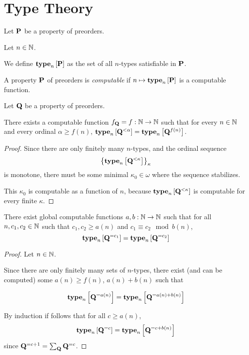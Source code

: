 \section{Type Theory}
\begin{definition}
    Let $\mathbf{P}$ be a property of preorders.

    Let $n \in \mathbb{N}$.

    We define $\mathbf{type}_{n} \left[ {\mathbf{P}} \right]$ as the set of all
    $n$-types satisfiable in $\mathbf{P}$.
\end{definition}

\begin{definition}
    A property $\mathbf{P}$ of preorders is \emph{computable} if
    $n \mapsto \mathbf{type}_{n} \left[ {\mathbf{P}} \right]$ is a computable function.
\end{definition}

\begin{lemma}\label{f-lemma}
    Let $\mathbf{Q}$ be a property of preorders.

    There exists a computable function $f_{\mathbf{Q}} = f: \mathbb{N} \to \mathbb{N}$ such that
    for every $n \in \mathbb{N}$ and every ordinal $\alpha \ge f(n)$,
    $\mathbf{type}_{n} \left[ {\mathbf{Q}^{< \alpha}} \right] = \mathbf{type}_{n} \left[ {\mathbf{Q}^{f(n)}} \right]$.
\end{lemma}

\begin{proof}
    Since there are only finitely many $n$-types,
    and the ordinal sequence \[\left\{ {\mathbf{type}_{n} \left[ {\mathbf{Q}^{< \kappa}} \right]} \right\}_{\kappa}\]
    is monotone,
    there must be some minimal $\kappa_0 \in \omega$ where the sequence stabilizes.

    This $\kappa_0$ is computable as a function of $n$, because
    $\mathbf{type}_{n} \left[ {\mathbf{Q}^{< \kappa}} \right]$ is computable for every finite $\kappa$.
\end{proof}

\begin{lemma}\label{ab-lemma}
    There exist global computable functions $a, b : \mathbb{N} \to \mathbb{N}$ such that
    for all $n, c_1, c_2 \in \mathbb{N}$ such that $c_1, c_2 \ge a(n)$ and $c_1 \equiv c_2 \mod b(n)$,
    \[\mathbf{type}_{n} \left[ {\mathbf{Q}^{= c_1}} \right] = \mathbf{type}_{n} \left[ {\mathbf{Q}^{= c_2}} \right]\]
\end{lemma}

\begin{proof}
    Let $n \in \mathbb{N}$.

    Since there are only finitely many sets of $n$-types,
    there exist (and can be computed)
    some $a(n) \ge f(n)$, $a(n) + b(n)$ such that

    \[
        \mathbf{type}_{n} \left[ {\mathbf{Q}^{= a(n)}} \right] = \mathbf{type}_{n} \left[ {\mathbf{Q}^{= a(n) + b(n)}} \right]
    \]

    By induction if follows that for all $c \ge a(n)$,
    \[\mathbf{type}_{n} \left[ {\mathbf{Q}^{= c}} \right] = \mathbf{type}_{n} \left[ {\mathbf{Q}^{= c + b(n)}} \right]\]
    since $\mathbf{Q}^{= c + 1} = \sum_{\mathbf{Q}} \mathbf{Q}^{= c}$.
\end{proof}


